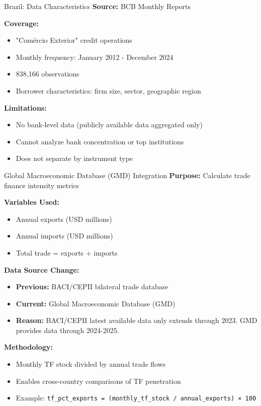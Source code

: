 \documentclass[aspectratio=169,11pt]{beamer}
\begin{document}
\begin{frame}{Brazil: Data Characteristics}
\textbf{Source:} BCB Monthly Reports

\vspace{0.3cm}
\textbf{Coverage:}
\begin{itemize}
    \item "Comércio Exterior" credit operations
    \item Monthly frequency: January 2012 - December 2024
    \item 838,166 observations
    \item Borrower characteristics: firm size, sector, geographic region
\end{itemize}

\vspace{0.3cm}
\textbf{Limitations:}
\begin{itemize}
    \item No bank-level data (publicly available data aggregated only)
    \item Cannot analyze bank concentration or top institutions
    \item Does not separate by instrument type
\end{itemize}
\end{frame}

\begin{frame}{Global Macroeconomic Database (GMD) Integration}
\textbf{Purpose:} Calculate trade finance intensity metrics

\vspace{0.3cm}
\textbf{Variables Used:}
\begin{itemize}
    \item Annual exports (USD millions)
    \item Annual imports (USD millions)
    \item Total trade = exports + imports
\end{itemize}

\vspace{0.3cm}
\textbf{Data Source Change:}
\begin{itemize}
    \item \textbf{Previous:} BACI/CEPII bilateral trade database
    \item \textbf{Current:} Global Macroeconomic Database (GMD)
    \item \textbf{Reason:} BACI/CEPII latest available data only extends through 2023. GMD provides data through 2024-2025.
\end{itemize}

\vspace{0.3cm}
\textbf{Methodology:}
\begin{itemize}
    \item Monthly TF stock divided by annual trade flows
    \item Enables cross-country comparisons of TF penetration
    \item Example: \texttt{tf\_pct\_exports = (monthly\_tf\_stock / annual\_exports) × 100}
\end{itemize}
\end{frame}
\end{document}
